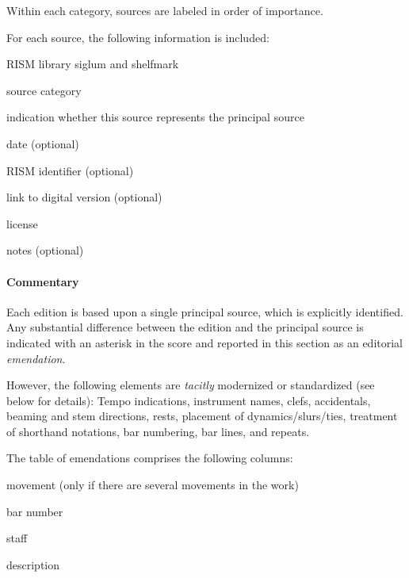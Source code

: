 \documentclass{ees}
\begin{document}
Within each category, sources are labeled in order of importance.

For each source, the following information is included:
\begin{bulletlist}
  \item RISM library siglum and shelfmark
  \item source category
  \item indication whether this source represents the principal source
  \item date (optional)
  \item RISM identifier (optional)
  \item link to digital version (optional)
  \item license
  \item notes (optional)
\end{bulletlist}

\paragraph{Commentary}
Each edition is based upon a single principal source, which is explicitly identified. Any substantial difference between the edition and the principal source is indicated with an asterisk in the score and reported in this section as an editorial \textit{emendation}.

However, the following elements are \textit{tacitly} modernized or standardized (see below for details): Tempo indications, instrument names, clefs, accidentals, beaming and stem directions, rests, placement of dynamics/slurs/ties, treatment of shorthand notations, bar numbering, bar lines, and repeats.

The table of emendations comprises the following columns:
\begin{bulletlist}
  \item movement (only if there are several movements in the work)
  \item bar number
  \item staff
  \item description
\end{bulletlist}
\end{document}
